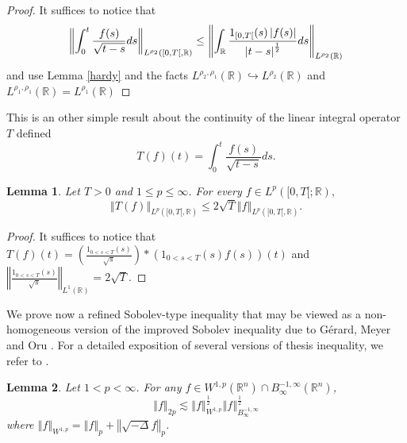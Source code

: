 \documentclass[11pt]{amsart}%
\theoremstyle{plain}
\numberwithin{equation}{section}
\newtheorem{lemma}{Lemma}[section]
\begin{document}
\begin{proof}
It suffices to notice that%
\[
\left\Vert \int_{0}^{t}\frac{f(s)}{\sqrt{t-s}}ds\right\Vert _{L^{\rho
_{2}}([0,T[,\mathbb{R})}\leq \left\Vert \int_{\mathbb{R}} \frac{1_{[0,T[}(s)\left\vert f(s)\right\vert}{%
\left\vert t-s\right\vert ^{\frac{1}{2}}}ds\right\Vert _{L^{\rho _{2}}(%
\mathbb{R})}
\]%
and use Lemma \ref{hardy} and the facts $L^{\rho _{2},\rho_1}(%
\mathbb{R})\hookrightarrow L^{\rho _{2}}(%
\mathbb{R})$ and  $L^{\rho _{1},\rho_1}(%
\mathbb{R})=L^{\rho _{1}}(%
\mathbb{R})$
\end{proof}
\par\noindent This is an other simple result about the continuity of the linear integral operator $T$ defined
$$T(f)(t)=\int_{0}^{t}\frac{f(s)}{\sqrt{t-s}}ds.$$
\begin{lemma}\label{con}
Let $T>0$ and $1\leq p\leq\infty$. For every $f\in L^{p}([0,T[;%
\mathbb{R}),$
$$ \left\Vert T(f)\right\Vert_{L^{p}([0,T[,\mathbb{R})}\leq 2\sqrt{T}\left\Vert f\right\Vert_{L^{p}([0,T[,\mathbb{R})}.$$
\end{lemma}
\begin{proof}
It suffices to notice that $T(f)(t)=(\frac{1_{0<s<T}(s)}{\sqrt{s}})\ast(1_{0<s<T}(s)f(s))(t)$ and $\left\Vert \frac{1_{0<s<T}(s)}{\sqrt{s}}\right\Vert_{L^1(\mathbb{R})}=2\sqrt{T}$.
\end{proof}
We prove now a refined Sobolev-type inequality that may be viewed as a non-homogeneous version of the improved Sobolev inequality due to G\'erard, Meyer and Oru \cite{GMO}. For a detailed exposition of several versions of thesis inequality, we refer to \cite[Chapter 2]{BCD}.
\begin{lemma}\label{GMO}
Let $1<p<\infty$. For any $f\in W^{1,p}(\mathbb{R}^n)\cap B^{-1,\infty}_\infty(\mathbb{R}^n)$,
$$\left\Vert f\right\Vert_{2p}\lesssim \left\Vert f\right\Vert_{W^{1,p}}^{\frac{1}{2}}\left\Vert f\right\Vert_{B^{-1,\infty}_\infty }^{\frac{1}{2}} $$
where $\left\Vert f\right\Vert_{W^{1,p}}=\left\Vert f\right\Vert_p +\left\Vert\sqrt{-\Delta} f\right\Vert_p$.
\end{lemma}
\end{document}
